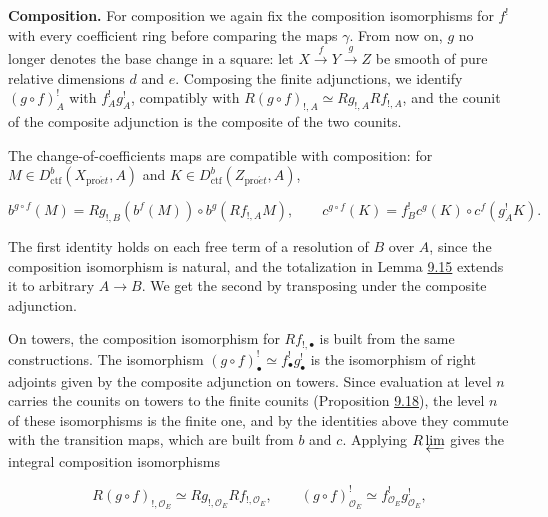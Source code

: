 \documentclass[11pt]{article}
\begin{document}
\label{bp80}%
\textbf{Composition.} For composition we again fix the composition isomorphisms for \(f^!\) with every coefficient ring before comparing the maps \(\gamma\). From now on, \(g\) no longer denotes the base change in a square: let \(X\xrightarrow{f}Y\xrightarrow{g}Z\) be smooth of pure relative dimensions \(d\) and \(e\). Composing the finite adjunctions, we identify \((g\circ f)_A^!\) with \(f_A^!g_A^!\), compatibly with \(R(g\circ f)_{!,A}\simeq Rg_{!,A}Rf_{!,A}\), and the counit of the composite adjunction is the composite of the two counits.

The change-of-coefficients maps are compatible with composition: for \(M\in D^b_{\mathrm{ctf}}(X_{\mathrm{pro}\acute{e}t},A)\) and \(K\in D^b_{\mathrm{ctf}}(Z_{\mathrm{pro}\acute{e}t},A)\),

\[
b^{g\circ f}(M)=Rg_{!,B}(b^f(M))\circ b^g(Rf_{!,A}M),
\qquad
c^{g\circ f}(K)=f_B^!c^g(K)\circ c^f(g_A^!K).
\]

The first identity holds on each free term of a resolution of \(B\) over \(A\), since the composition isomorphism is natural, and the totalization in Lemma \hyperref[bp49]{9.15} extends it to arbitrary \(A\to B\). We get the second by transposing under the composite adjunction.

On towers, the composition isomorphism for \(Rf_{!,\bullet}\) is built from the same constructions. The isomorphism \((g\circ f)^!_\bullet\simeq f^!_\bullet g^!_\bullet\) is the isomorphism of right adjoints given by the composite adjunction on towers. Since evaluation at level \(n\) carries the counits on towers to the finite counits (Proposition \hyperref[bp60]{9.18}), the level \(n\) of these isomorphisms is the finite one, and by the identities above they commute with the transition maps, which are built from \(b\) and \(c\). Applying \(R\varprojlim\) gives the integral composition isomorphisms

\[
R(g\circ f)_{!,\mathcal O_E}\simeq Rg_{!,\mathcal O_E}Rf_{!,\mathcal O_E},
\qquad
(g\circ f)_{\mathcal O_E}^{!}\simeq f_{\mathcal O_E}^{!}g_{\mathcal O_E}^{!},
\]
\end{document}
